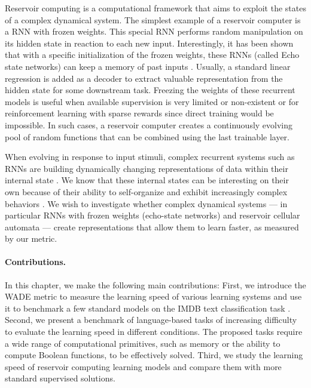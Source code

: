 Reservoir computing is a computational framework that aims to exploit the states
of a complex dynamical system. The simplest example of a reservoir computer is a
\ac{RNN} with frozen weights. This special \ac{RNN} performs random manipulation
on its hidden state in reaction to each new input. Interestingly, it has been
shown that with a specific initialization of the frozen weights, these \ac{RNN}s
(called Echo state networks) can keep a memory of past inputs
\parencite{jaegerEchoStateApproach2001}. Usually, a standard linear regression
is added as a decoder to extract valuable representation from the hidden state
for some downstream task. Freezing the weights of these recurrent models is
useful when available supervision is very limited or non-existent or for
reinforcement learning with sparse rewards since direct training would be
impossible. In such cases, a reservoir computer creates a continuously evolving
pool of random functions that can be combined using the last trainable layer.


When evolving in response to input stimuli, complex recurrent systems such as
\acp{RNN} are building dynamically changing representations of data within their
internal state \parencite{boccaraModelingComplexSystems2010}. We know that these
internal states can be interesting on their own because of their ability to
self-organize and exhibit increasingly complex behaviors
\parencite{koppelAlmostMachineindependentTheory1991,
  bennettLogicalDepthPhysical1995, allenEvolutionEmergenceLearning2003,
  goldsteinEmergenceComplexSystems2011, cisnerosEvolvingStructuresComplex2019}.
We wish to investigate whether complex dynamical systems --- in
particular RNNs with frozen weights (echo-state networks)
\parencite{jaegerEchoStateApproach2001} and reservoir cellular automata
\parencite{yilmazReservoirComputingUsing2014} --- create representations that
allow them to learn faster, as measured by our metric.

\paragraph{Contributions.} In this chapter, we make the following main
contributions: First, we introduce the \acf{WADE} metric to measure the learning
speed of various learning systems and use it to benchmark a few standard models
on the IMDB text classification task \parencite{maasLearningWordVectors2011}.
Second, we present a benchmark of language-based tasks of increasing difficulty
to evaluate the learning speed in different conditions. The proposed tasks
require a wide range of computational primitives, such as memory or the ability
to compute Boolean functions, to be effectively solved. Third, we study the
learning speed of reservoir computing learning models and compare them with more
standard supervised solutions.

